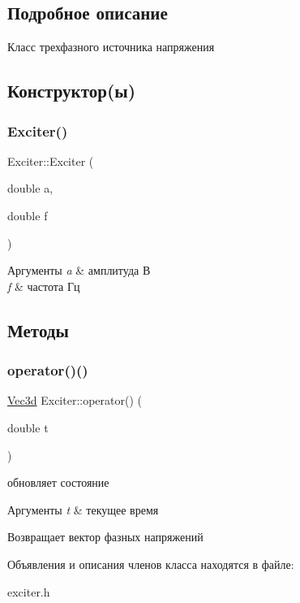\subsection{Подробное описание}
Класс трехфазного источника напряжения 

\subsection{Конструктор(ы)}
\mbox{\label{classExciter_a4d33a218b5cafd84cd55c8b51cd9246d}} 
\subsubsection{\texorpdfstring{Exciter()}{Exciter()}}
{\footnotesize\ttfamily Exciter\+::\+Exciter (\begin{DoxyParamCaption}\item[{double}]{a,  }\item[{double}]{f }\end{DoxyParamCaption})\hspace{0.3cm}{\ttfamily [inline]}}


\begin{DoxyParams}{Аргументы}
{\em a} & амплитуда В \\
\hline
{\em f} & частота Гц \\
\hline
\end{DoxyParams}


\subsection{Методы}
\mbox{\label{classExciter_a7dae2402806160fd5b7a12e9088b6c05}} 
\subsubsection{\texorpdfstring{operator()()}{operator()()}}
{\footnotesize\ttfamily \hyperlink{structVec3}{Vec3d} Exciter\+::operator() (\begin{DoxyParamCaption}\item[{double}]{t }\end{DoxyParamCaption})\hspace{0.3cm}{\ttfamily [inline]}}



обновляет состояние 


\begin{DoxyParams}{Аргументы}
{\em t} & текущее время \\
\hline
\end{DoxyParams}
\begin{DoxyReturn}{Возвращает}
вектор фазных напряжений 
\end{DoxyReturn}


Объявления и описания членов класса находятся в файле\+:\begin{DoxyCompactItemize}
\item 
exciter.\+h\end{DoxyCompactItemize}
